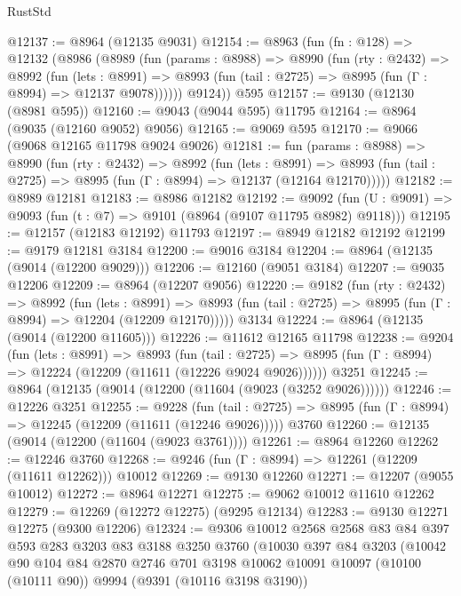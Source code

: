 \begin{lexlean}{RustStd}
\begin{coremodule}
@12137 := @8964 (@12135 @9031)
@12154 := @8963
    (fun (fn : @128) =>
    @12132
      (@8986
        (@8989
          (fun (params : @8988) =>
          @8990
            (fun (rty : @2432) =>
            @8992
              (fun (lets : @8991) =>
              @8993 (fun (tail : @2725) => @8995 (fun (Γ : @8994) => @12137 @9078))))))
        @9124))
    @595
@12157 := @9130 (@12130 (@8981 @595))
@12160 := @9043 (@9044 @595) @11795
@12164 := @8964 (@9035 (@12160 @9052) @9056)
@12165 := @9069 @595
@12170 := @9066 (@9068 @12165 @11798 @9024 @9026)
@12181 := fun (params : @8988) =>
  @8990
    (fun (rty : @2432) =>
    @8992
      (fun (lets : @8991) =>
      @8993 (fun (tail : @2725) => @8995 (fun (Γ : @8994) => @12137 (@12164 @12170)))))
@12182 := @8989 @12181
@12183 := @8986 @12182
@12192 := @9092
    (fun (U : @9091) => @9093 (fun (t : @7) => @9101 (@8964 (@9107 @11795 @8982) @9118)))
@12195 := @12157 (@12183 @12192) @11793
@12197 := @8949 @12182 @12192
@12199 := @9179 @12181 @3184
@12200 := @9016 @3184
@12204 := @8964 (@12135 (@9014 (@12200 @9029)))
@12206 := @12160 (@9051 @3184)
@12207 := @9035 @12206
@12209 := @8964 (@12207 @9056)
@12220 := @9182
    (fun (rty : @2432) =>
    @8992
      (fun (lets : @8991) =>
      @8993 (fun (tail : @2725) => @8995 (fun (Γ : @8994) => @12204 (@12209 @12170)))))
    @3134
@12224 := @8964 (@12135 (@9014 (@12200 @11605)))
@12226 := @11612 @12165 @11798
@12238 := @9204
    (fun (lets : @8991) =>
    @8993
      (fun (tail : @2725) =>
      @8995 (fun (Γ : @8994) => @12224 (@12209 (@11611 (@12226 @9024 @9026))))))
    @3251
@12245 := @8964 (@12135 (@9014 (@12200 (@11604 (@9023 (@3252 @9026))))))
@12246 := @12226 @3251
@12255 := @9228
    (fun (tail : @2725) => @8995 (fun (Γ : @8994) => @12245 (@12209 (@11611 (@12246 @9026)))))
    @3760
@12260 := @12135 (@9014 (@12200 (@11604 (@9023 @3761))))
@12261 := @8964 @12260
@12262 := @12246 @3760
@12268 := @9246 (fun (Γ : @8994) => @12261 (@12209 (@11611 @12262))) @10012
@12269 := @9130 @12260
@12271 := @12207 (@9055 @10012)
@12272 := @8964 @12271
@12275 := @9062 @10012 @11610 @12262
@12279 := @12269 (@12272 @12275) (@9295 @12134)
@12283 := @9130 @12271 @12275 (@9300 @12206)
@12324 := @9306
    @10012
    @2568
    @2568
    @83
    @84
    @397
    @593
    @283
    @3203
    @83
    @3188
    @3250
    @3760
    (@10030
      @397
      @84
      @3203
      (@10042
        @90
        @104
        @84
        @2870
        @2746
        @701
        @3198
        @10062
        @10091
        @10097
        (@10100 (@10111 @90))
        @9994
        (@9391 (@10116 @3198 @3190))

\end{coremodule}
\end{lexlean}
